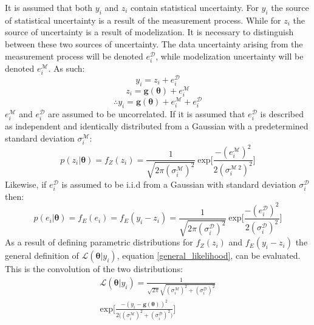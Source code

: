 \begin{tcolorbox}[enhanced jigsaw,breakable,pad at break*=1mm,title=Technical figure 2: Applied likelihood derivation, title filled,fonttitle=\sffamily\bfseries,fontupper=\sffamily\scriptsize]
\label{tf2}
\begin{multicols}{2}
It is assumed that both $y_i$ and $z_i$ contain statistical uncertainty. For $y_i$ the source of statistical uncertainty is a result of the measurement process. While for $z_i$ the source of uncertainty is a result of modelization. It is necessary to distinguish between these two sources of uncertainty. The data uncertainty arising from the measurement process will be denoted $e^{\mathcal{D}}_i$, while modelization uncertainty will be denoted $e^{\mathcal{M}}_i$. As such:
\begin{equation}
y_i = z_i + e^{\mathcal{D}}_i
\end{equation}
\begin{equation}
z_i = \bm{g}(\bm{\theta}) + e^{\mathcal{M}}_i
\end{equation}
\begin{equation}
\therefore y_i = \bm{g}(\bm{\theta}) + e^{\mathcal{M}}_i + e^{\mathcal{D}}_i
\end{equation}
$e^{\mathcal{M}}_i$ and $e^{\mathcal{D}}_i$ are assumed to be uncorrelated. If it is assumed that $e^{\mathcal{D}}_i$ is described as independent and identically distributed from a Gaussian with a predetermined standard deviation $\sigma^{\mathcal{M}}_i$: 
\begin{equation}
p(z_i|\bm{\theta}) = f_Z(z_i) = \frac{1}{\sqrt{2\pi(\sigma^{\mathcal{M}}_i)^2}}\ \text{exp}\bigg[\frac{-(e^{\mathcal{M}}_i)^2}{2(\sigma^{\mathcal{M}\ 2}_i)^2} \bigg]
\end{equation} 
Likewise, if $e^{\mathcal{D}}_i$ is assumed to be i.i.d from a Gaussian with standard deviation $\sigma^{\mathcal{D}}_i$ then:
\begin{equation}
p(e_i|\bm{\theta}) = f_E(e_i) = f_E(y_i-z_i) = \frac{1}{\sqrt{2\pi(\sigma^{\mathcal{D}}_i)^2}}\ \text{exp}\bigg[\frac{-(e^{\mathcal{D}}_i)^2}{2(\sigma^{\mathcal{D}}_i)^2} \bigg]
\end{equation}
As a result of defining parametric distributions for $f_Z(z_i)$ and $f_E(y_i-z_i)$ the general definition of $\mathcal{L}(\bm{\theta}|y_i)$, equation \ref{general_likelihood}, can be evaluated. This is the convolution of the two distributions: 
\begin{equation}
\begin{split}
\mathcal{L}(\bm{\theta}|y_i) = \frac{1}{\sqrt{2\pi}\sqrt{(\sigma^{\mathcal{M}}_i)^2+(\sigma^{\mathcal{D}}_i)^2}}\\
\text{exp}\bigg[\frac{-(y_i-\bm{g}(\bm{\theta}))^2}{2\big((\sigma^{\mathcal{M}}_i)^2+(\sigma^{\mathcal{D}}_i)^2\big)}\bigg]
\end{split}
\label{single-data-likelihood}
\end{equation}\par


\end{multicols}
\end{tcolorbox}
